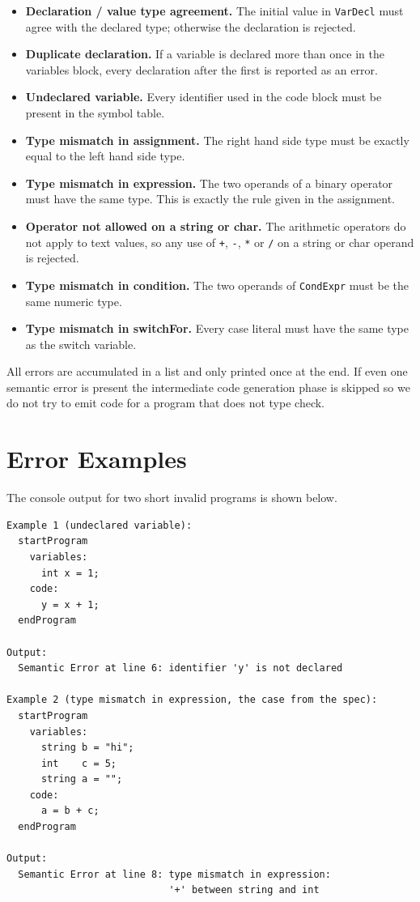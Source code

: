 \documentclass[12pt,a4paper]{report}
\begin{document}
\begin{itemize}
\item \textbf{Declaration / value type agreement.} The initial value in \texttt{VarDecl} must agree with the declared type; otherwise the declaration is rejected.
\item \textbf{Duplicate declaration.} If a variable is declared more than once in the variables block, every declaration after the first is reported as an error.
\item \textbf{Undeclared variable.} Every identifier used in the code block must be present in the symbol table.
\item \textbf{Type mismatch in assignment.} The right hand side type must be exactly equal to the left hand side type.
\item \textbf{Type mismatch in expression.} The two operands of a binary operator must have the same type. This is exactly the rule given in the assignment.
\item \textbf{Operator not allowed on a string or char.} The arithmetic operators do not apply to text values, so any use of \texttt{+}, \texttt{-}, \texttt{*} or \texttt{/} on a string or char operand is rejected.
\item \textbf{Type mismatch in condition.} The two operands of \texttt{CondExpr} must be the same numeric type.
\item \textbf{Type mismatch in switchFor.} Every case literal must have the same type as the switch variable.
\end{itemize}

All errors are accumulated in a list and only printed once at the end. If even one semantic error is present the intermediate code generation phase is skipped so we do not try to emit code for a program that does not type check.

\section{Error Examples}

The console output for two short invalid programs is shown below.

\begin{verbatim}
Example 1 (undeclared variable):
  startProgram
    variables:
      int x = 1;
    code:
      y = x + 1;
  endProgram

Output:
  Semantic Error at line 6: identifier 'y' is not declared

Example 2 (type mismatch in expression, the case from the spec):
  startProgram
    variables:
      string b = "hi";
      int    c = 5;
      string a = "";
    code:
      a = b + c;
  endProgram

Output:
  Semantic Error at line 8: type mismatch in expression:
                            '+' between string and int
\end{verbatim}
\end{document}
